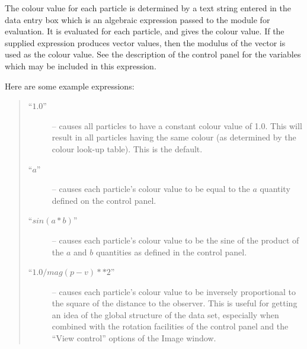 \begin{description}
The colour value for each particle is determined by a text string entered
in the  data entry box which is an
algebraic expression passed to the  module for
evaluation. It is evaluated for each particle, and gives the colour
value. If the supplied expression produces vector values, then the
modulus of the vector is used as the colour value. See the description of
the  control panel for the
variables which may be included in this expression.

Here are some  example expressions:

\begin{quote}
\begin{description}

\item [``$1.0$'' ] -- causes all particles to have a constant colour value of 1.0. This
will result in all particles having the same colour (as determined by
the colour look-up table). This is the default.

\item  [``$a$'' ] -- causes each particle's colour value to be equal to the $a$
 quantity defined on the  control panel.

\item [``$sin(a*b)$'' ] -- causes each particle's colour value to be the sine of the
product of the $a$ and $b$ quantities as defined in the  control panel.

\item [``$1.0/mag(p-v)**2$'' ] -- causes each particle's colour value to be inversely
proportional to the square of the distance to the observer. This is
useful for getting an idea of the global structure of the data set,
especially when combined with the rotation facilities of the
 control panel and the ``View control'' options
of the Image window.

\end{description}
\end{quote}


\end{description}
